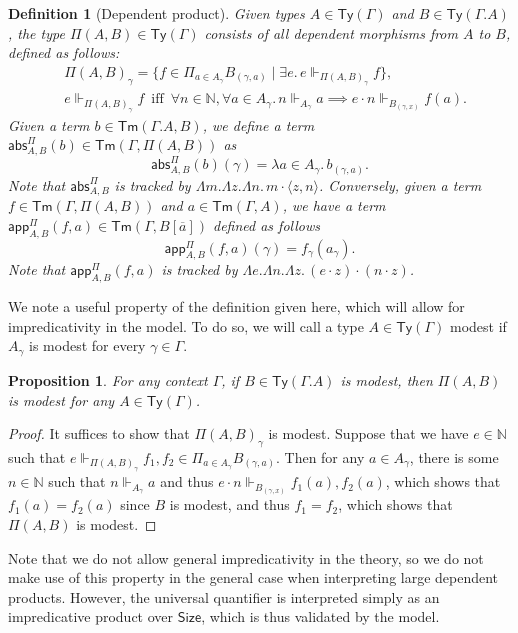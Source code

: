 \documentclass[10pt,a4paper]{article}
\newtheorem{proposition}[theorem]{Proposition}
\newtheorem{definition}[theorem]{Definition}
\theoremstyle{definition}
\theoremstyle{remark}
\renewcommand{\.}{.\,} %
\renewcommand{\:}{:} %
\newcommand{\bN}{\mathbb{N}}
\newcommand{\Size}{\mathsf{Size}}
\newcommand{\0}{\mathbf{0}}
\newcommand{\1}{\mathbf{1}}
\newcommand\<\langle
\renewcommand\>\rangle
\newcommand{\app}{\mathsf{app}}
\newcommand{\abs}{\mathsf{abs}}
\newcommand{\Ty}{\mathsf{Ty}}
\newcommand{\Tm}{\mathsf{Tm}}
\newcommand{\Iff}{\hspace{6pt}\text{iff}\hspace{6pt}}
\theoremstyle{remark}
\begin{document}
\begin{definition}[Dependent product]
	Given types $A \in \Ty(\Gamma)$ and $B \in \Ty(\Gamma.A)$, the type $\Pi(A, B) \in \Ty(\Gamma)$ consists of all dependent morphisms from $A$ to $B$, defined as follows:
	\begin{align*}
		&\Pi(A, B)_\gamma = \{ f \in \Pi_{a \in A_\gamma}  B_{(\gamma, a)} \mid \exists e \. e \Vdash_{\Pi(A, B)_\gamma} f \},\\
		&e \Vdash_{\Pi(A, B)_\gamma} f \Iff \forall n \in \bN, \forall a \in A_\gamma \. n \Vdash_{A_\gamma} a \implies e \cdot n \Vdash_{B_{(\gamma, x)}} f (a).
	\end{align*}
	Given a term $b \in \Tm(\Gamma.A, B)$, we define a term $\abs^\Pi_{A, B} (b) \in \Tm(\Gamma, \Pi(A, B))$ as
	\[
	\abs^\Pi_{A, B} (b)(\gamma) = \lambda a \in A_\gamma \. b_{(\gamma, a)}.
	\]
	Note that $\abs^\Pi_{A, B}$ is tracked by $\Lambda m . \Lambda z . \Lambda n\. m \cdot \langle z, n \rangle$. 
	Conversely, given a term $f \in \Tm(\Gamma, \Pi(A, B))$ and $a \in \Tm (\Gamma, A)$, we have a term $\app^\Pi_{A, B}(f, a) \in \Tm(\Gamma, B[\overline{a}])$ defined as follows
	\[
	\app^\Pi_{A, B}(f, a)(\gamma)  = f_\gamma(a_\gamma).
	\]
	Note that $\app^\Pi_{A, B}(f, a)$ is tracked by $\Lambda e . \Lambda n . \Lambda z \. (e \cdot z) \cdot (n \cdot z)$.
\end{definition}

We note a useful property of the definition given here, which will allow for impredicativity in the model. To do so, we will call a type $A \in \Ty(\Gamma)$ modest if $A_\gamma$ is modest for every $\gamma \in \Gamma$.
\begin{proposition}
	For any context $\Gamma$, if $B \in \Ty(\Gamma.A)$ is modest, then $\Pi(A, B)$ is modest for any $A \in \Ty(\Gamma)$.
\end{proposition}
\begin{proof}
	It suffices to show that $\Pi(A, B)_\gamma$ is modest. Suppose that we have $e \in \bN$ such that $e \Vdash_{\Pi(A, B)_\gamma} f_1, f_2 \in \Pi_{a \in A_\gamma}  B_{(\gamma, a)}$. Then for any $a \in A_\gamma$, there is some $n \in \bN$ such that $n \Vdash_{A_\gamma} a$ and thus $e \cdot n \Vdash_{B_{(\gamma, x)}} f_1(a), f_2(a)$, which shows that $f_1(a) = f_2(a)$ since $B$ is modest, and thus $f_1 = f_2$, which shows that $\Pi(A, B)$ is modest.
\end{proof}
Note that we do not allow general impredicativity in the theory, so we do not make use of this property in the general case when interpreting large dependent products. However, the universal quantifier is interpreted simply as an impredicative product over $\Size$, which is thus validated by the model.
\end{document}
